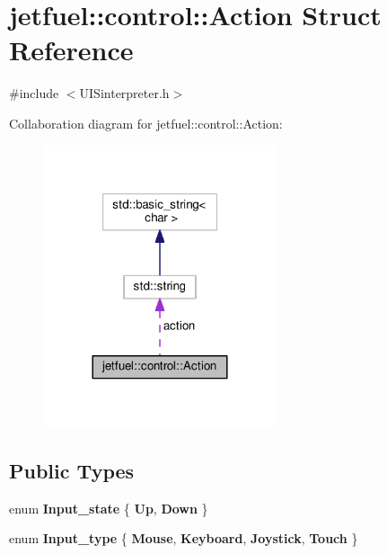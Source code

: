 \hypertarget{structjetfuel_1_1control_1_1Action}{}\section{jetfuel\+:\+:control\+:\+:Action Struct Reference}
\label{structjetfuel_1_1control_1_1Action}


{\ttfamily \#include $<$U\+I\+Sinterpreter.\+h$>$}



Collaboration diagram for jetfuel\+:\+:control\+:\+:Action\+:\nopagebreak
\begin{figure}[H]
\begin{center}
\leavevmode
\includegraphics[width=192pt]{structjetfuel_1_1control_1_1Action__coll__graph}
\end{center}
\end{figure}
\subsection*{Public Types}
\begin{DoxyCompactItemize}
\item 
\mbox{\label{structjetfuel_1_1control_1_1Action_a619ce738704c0ff88688056437e8743a}} 
enum {\bfseries Input\+\_\+state} \{ {\bfseries Up}, 
{\bfseries Down}
 \}
\item 
\mbox{\label{structjetfuel_1_1control_1_1Action_a52c78bcd5d7251daa99fa97487356a75}} 
enum {\bfseries Input\+\_\+type} \{ {\bfseries Mouse}, 
{\bfseries Keyboard}, 
{\bfseries Joystick}, 
{\bfseries Touch}
 \}
\end{DoxyCompactItemize}
